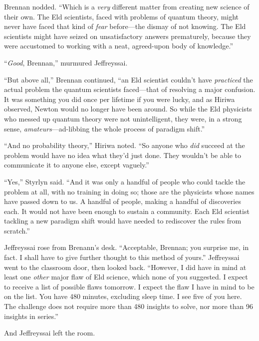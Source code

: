 {
 Brennan nodded. ``Which is a \textit{very}
different matter from creating new science of their own. The Eld
scientists, faced with problems of quantum theory, might never have
faced that kind of \textit{fear} before---the dismay of not knowing.
The Eld scientists might have seized on unsatisfactory answers
prematurely, because they were accustomed to working with a neat,
agreed-upon body of knowledge.''}

{
 ``\textit{Good}, Brennan,''
murmured Jeffreyssai.}

{
 ``But above all,'' Brennan
continued, ``an Eld scientist couldn't
have \textit{practiced} the actual problem the quantum scientists
faced---that of resolving a major confusion. It was something you did
once per lifetime if you were lucky, and as Hiriwa observed, Newton
would no longer have been around. So while the Eld physicists who
messed up quantum theory were not unintelligent, they were, in a strong
sense, \textit{amateurs}{}---ad-libbing the whole process of paradigm
shift.''}

{
 ``And no probability theory,''
Hiriwa noted. ``So anyone who \textit{did} succeed at
the problem would have no idea what they'd just done.
They wouldn't be able to communicate it to anyone else,
except vaguely.''}

{
 ``Yes,'' Styrlyn said.
``And it was only a handful of people who could tackle
the problem at all, with no training in doing so; those are the
physicists whose names have passed down to us. A handful of people,
making a handful of discoveries each. It would not have been enough to
sustain a community. Each Eld scientist tackling a new paradigm shift
would have needed to rediscover the rules from
scratch.''}

{
 Jeffreyssai rose from Brenann's desk.
``Acceptable, Brennan; you surprise me, in fact. I
shall have to give further thought to this method of
yours.'' Jeffreyssai went to the classroom door, then
looked back. ``However, I did have in mind at least
one \textit{other} major flaw of Eld science, which none of you
suggested. I expect to receive a list of possible flaws tomorrow. I
expect the flaw I have in mind to be on the list. You have 480 minutes,
excluding sleep time. I see five of you here. The challenge does not
require more than 480 insights to solve, nor more than 96 insights in
series.''}

{
 And Jeffreyssai left the room.}

\myendsectiontext


